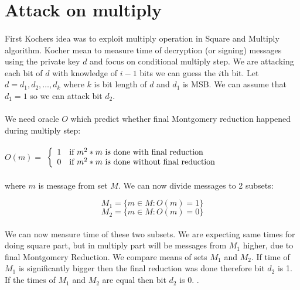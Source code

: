 \documentclass[thesis=B,english]{FITthesis}[2012/10/20]
\begin{document}
{{\section{Attack on multiply}
\paragraph*{}{
First Kochers idea was to exploit multiply operation in Square and Multiply algorithm. Kocher mean to measure time of decryption (or signing) messages using the private key \(d\) 
and focus on conditional multiply step. We are attacking each bit of \(d\) with knowledge of \( i-1\) bits we can guess the \(i\)th bit. Let \(d = d_1,d_2, \ldots ,d_k \) where \(k\) is bit length of \(d\) and \(d_1\) is MSB. 
We can assume that \( d_1 = 1\) so we can attack bit \(d_2\).\cite{Kocher1996}
}
\paragraph*{}{
We need oracle \(O\) which predict whether final Montgomery reduction happened during multiply step:
}\cite{mi-kry}
\paragraph*{}

\( O(m) =\) $\left\{
  \begin{array}{cl}
    \text{1} & \text{\mbox{if}  \(m^2 * m\) is done with final reduction} \\
    \text{0} & \text{\mbox{if}  \(m^2 * m\) is done without final reduction} 
  \end{array}
\right.$

\paragraph*{}
{
where \(m\) is message from set \(M\). We can now divide messages to 2 subsets:}

\[M_1 = \{m \in M : O(m) = 1\}\]
\[M_2 = \{m \in M : O(m) = 0\}\]

\paragraph*{}{
We can now measure time of these two subsets. We are expecting same times for doing square part, but in multiply part will be messages from \(M_1\) higher, due to
final Montgomery Reduction. We compare means of sets \(M_1\) and \(M_2\). If time of \(M_1\) is significantly bigger then the final reduction was done therefore bit \(d_2\)
is 1. If the times of \(M_1\) and \(M_2\) are equal then bit \(d_2\) is 0. . }

}}
\end{document}
